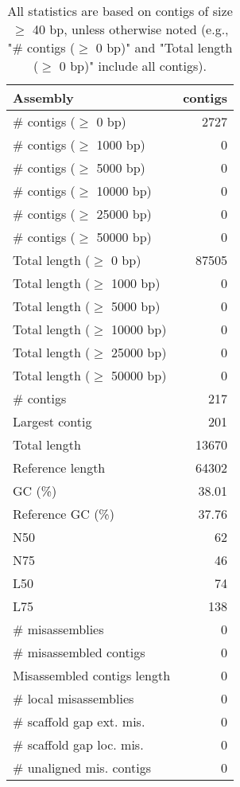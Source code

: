 \documentclass[12pt,a4paper]{article}
\begin{document}
\begin{table}[ht]
\begin{center}
\caption{All statistics are based on contigs of size $\geq$ 40 bp, unless otherwise noted (e.g., "\# contigs ($\geq$ 0 bp)" and "Total length ($\geq$ 0 bp)" include all contigs).}
\begin{tabular}{|l*{1}{|r}|}
\hline
Assembly & contigs \\ \hline
\# contigs ($\geq$ 0 bp) & 2727 \\ \hline
\# contigs ($\geq$ 1000 bp) & 0 \\ \hline
\# contigs ($\geq$ 5000 bp) & 0 \\ \hline
\# contigs ($\geq$ 10000 bp) & 0 \\ \hline
\# contigs ($\geq$ 25000 bp) & 0 \\ \hline
\# contigs ($\geq$ 50000 bp) & 0 \\ \hline
Total length ($\geq$ 0 bp) & 87505 \\ \hline
Total length ($\geq$ 1000 bp) & 0 \\ \hline
Total length ($\geq$ 5000 bp) & 0 \\ \hline
Total length ($\geq$ 10000 bp) & 0 \\ \hline
Total length ($\geq$ 25000 bp) & 0 \\ \hline
Total length ($\geq$ 50000 bp) & 0 \\ \hline
\# contigs & 217 \\ \hline
Largest contig & 201 \\ \hline
Total length & 13670 \\ \hline
Reference length & 64302 \\ \hline
GC (\%) & 38.01 \\ \hline
Reference GC (\%) & 37.76 \\ \hline
N50 & 62 \\ \hline
N75 & 46 \\ \hline
L50 & 74 \\ \hline
L75 & 138 \\ \hline
\# misassemblies & 0 \\ \hline
\# misassembled contigs & 0 \\ \hline
Misassembled contigs length & 0 \\ \hline
\# local misassemblies & 0 \\ \hline
\# scaffold gap ext. mis. & 0 \\ \hline
\# scaffold gap loc. mis. & 0 \\ \hline
\# unaligned mis. contigs & 0 \\ \hline

\end{tabular}
\end{center}
\end{table}
\end{document}
